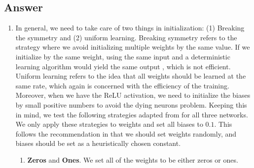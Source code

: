 \documentclass[
	12pt, %
]{../Template/fphw}
\begin{document}

\subsection*{Answer}

\begin{enumerate}[label = (\arabic*)] %
	\item In general, we need to take care of two things in initialization: (1) Breaking the symmetry and (2) uniform learning. Breaking symmetry refers to the strategy where we avoid initializing multiple weights by the same value. If we initialize by the same weight, using the same input and a deterministic learning algorithm would yield the same output \cite[p298]{Goodfellow-et-al-2016}, which is not efficient.  Uniform learning refers to the idea that all weights should be learned at the same rate, which again is concerned with the efficiency of the training. Moreover, when we have the ReLU activation, we need to initialize the biases by small positive numbers to avoid the dying neurons problem. Keeping this in mind, we test the following strategies adapted from \cite{Hosny2017} for all three networks. We only apply these strategies to weights and set all biases to $0.1$. This follows the recommendation in \cite[p298]{Goodfellow-et-al-2016} that we should set weights randomly, and biases should be set as a heuristically chosen constant.
    \begin{enumerate}
        \item \textbf{Zeros} and \textbf{Ones}. We set all of the weights to be either zeros or ones.
        

\end{enumerate}
\end{enumerate}
\end{document}

